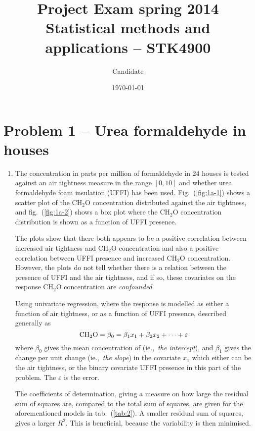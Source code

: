 \documentclass[a4paper,11pt]{article}
\date{\today}
\title{Project Exam spring 2014\\ \small{Statistical methods and applications -- STK4900}}
\author{Candidate}
\newcommand{\CHHO}{\text{CH\ensuremath{_2}O} }
\begin{document}
\onecolumn
\maketitle{}


\section*{Problem 1 -- Urea formaldehyde in houses}

\begin{enumerate}[label=1\alph*)]
    \item The concentration in parts per million of formaldehyde in 24 houses is tested against an air tightness measure in the range $[0,10]$ and whether urea formaldehyde foam insulation (UFFI) has been used. Fig.~(\ref{fig:1a-1}) shows a scatter plot of the CH$_2$O concentration distributed against the air tightness, and fig.~(\ref{fig:1a-2}) shows a box plot where the CH$_2$O concentration distribution is shown as a function of UFFI presence. 

        The plots show that there both appears to be a positive correlation between increased air tightness and CH$_2$O concentration and also a positive correlation between UFFI presence and increased CH$_2$O concentration. However, the plots do not tell whether there is a relation between the presence of UFFI and the air tightness, and if so, these covariates on the response CH$_2$O concentration are \textit{confounded}. 

        Using univariate regression, where the response \CHHO is modelled as either a function of air tightness, or as a function of UFFI presence, described generally as
        \begin{equation}
            {\rm CH_2O} = \beta_0 = \beta_1 x_1 + \beta_2 x_2 + \dots + \varepsilon
            \label{eq:linmod}
        \end{equation}
        where $\beta_0$ gives the mean concentration of \CHHO (ie.,~\textit{the intercept}), and $\beta_1$ gives the change per unit change (ie.,~\textit{the slope}) in the covariate $x_1$ which either can be the air tightness, or the binary covariate UFFI presence in this part of the problem. The $\varepsilon$ is the error. 

        The coefficients of determination, giving a measure on how large the residual sum of squares are, compared to the total sum of squares, are given for the aforementioned models in tab.~(\ref{tab:2}). A smaller residual sum of squares, gives a larger $R^2$.  This is beneficial, because the variability is then minimised.


\end{enumerate}
\end{document}
